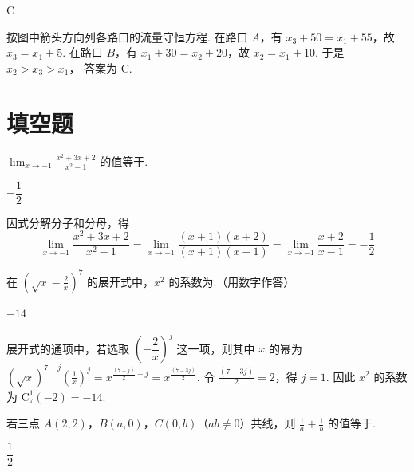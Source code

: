 \begin{answer}
C
\end{answer}

\begin{solution}
按图中箭头方向列各路口的流量守恒方程. 在路口 \(A\)，有 \(x_3+50=x_1+55\)，故 \(x_3=x_1+5\). 在路口 \(B\)，有 \(x_1+30=x_2+20\)，故 \(x_2=x_1+10\). 于是 \(x_2>x_3>x_1\)，
答案为 C.
\end{solution}

\section{填空题}
\begin{problem}
\(\displaystyle\lim_{x\to-1}\frac{x^2+3x+2}{x^2-1}\) 的值等于\fillinblank{}.
\end{problem}

\begin{answer}
\(-\dfrac12\)
\end{answer}

\begin{solution}
因式分解分子和分母，得
\[
\lim_{x\to-1}\frac{x^2+3x+2}{x^2-1}
=\lim_{x\to-1}\frac{(x+1)(x+2)}{(x+1)(x-1)}
=\lim_{x\to-1}\frac{x+2}{x-1}=-\frac12
\]
\end{solution}

\begin{problem}
在 \(\left(\sqrt{x}-\frac{2}{x}\right)^7\) 的展开式中，\(x^2\) 的系数为\fillinblank{}.（用数字作答）
\end{problem}

\begin{answer}
\(-14\)
\end{answer}

\begin{solution}
展开式的通项中，若选取 \(\left(-\dfrac2x\right)^j\) 这一项，则其中 \(x\) 的幂为 \(\left(\sqrt{x}\right)^{7-j}\left(\frac1x\right)^j=x^{\frac{(7-j)}{2}-j}=x^{\frac{(7-3j)}{2}}\). 令 \(\frac{(7-3j)}{2}=2\)，得 \(j=1\). 因此 \(x^2\) 的系数为 \(\mathrm C_7^1(-2)=-14\).
\end{solution}

\begin{problem}
若三点 \(A(2,2)\)，\(B(a,0)\)，\(C(0,b)\)（\(ab\neq0\)）共线，则 \(\frac{1}{a}+\frac{1}{b}\) 的值等于\fillinblank{}.
\end{problem}

\begin{answer}
\(\dfrac12\)
\end{answer}

